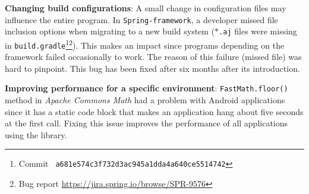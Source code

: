 {\bf Changing build configurations}: A small change in configuration files may
influence the entire program. In \texttt{Spring-framework}, a developer missed
file inclusion options when migrating to a new build system
(\texttt{$\ast$.aj} files were missing in \texttt{build.gradle}\footnote{Commit \tt\small
a681e574c3f732d3ac945a1dda4a640ce5514742}\footnote{Bug report \url{https://jira.spring.io/browse/SPR-9576}}). 
This makes an impact since programs depending on the framework failed occasionally
to work. The reason of this failure (missed file) was hard to pinpoint. This bug 
has been fixed after six months after its introduction.

{\bf Improving performance for a specific environment}:
\texttt{FastMath.floor()} method in \emph{Apache Commons Math} had a problem
with Android applications since it has a static code block that makes an
application hang about five seconds at the first call. Fixing this issue
improves the performance of all applications using the library. 



